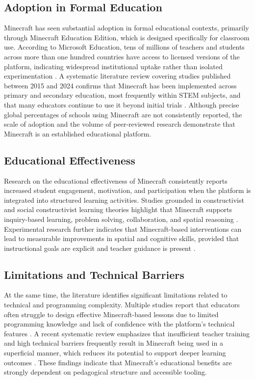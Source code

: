 \subsection{Adoption in Formal Education}

Minecraft has seen substantial adoption in formal educational contexts, primarily through Minecraft Education Edition, which is designed specifically for classroom use. 
According to Microsoft Education, tens of millions of teachers and students across more than one hundred countries have access to licensed versions of the platform, indicating widespread institutional uptake rather than isolated experimentation \cite{noauthor_licensing_nodate}. 
A systematic literature review covering studies published between 2015 and 2024 confirms that Minecraft has been implemented across primary and secondary education, most frequently within STEM subjects, and that many educators continue to use it beyond initial trials \cite{md_shamsudin_crafting_2024}. 
Although precise global percentages of schools using Minecraft are not consistently reported, the scale of adoption and the volume of peer-reviewed research demonstrate that Minecraft is an established educational platform.

\subsection{Educational Effectiveness}

Research on the educational effectiveness of Minecraft consistently reports increased student engagement, motivation, and participation when the platform is integrated into structured learning activities. 
Studies grounded in constructivist and social constructivist learning theories highlight that Minecraft supports inquiry-based learning, problem solving, collaboration, and spatial reasoning \cite{short_teaching_2012, kotsopoulos_pedagogical_2017}. 
Experimental research further indicates that Minecraft-based interventions can lead to measurable improvements in spatial and cognitive skills, provided that instructional goals are explicit and teacher guidance is present \cite{ming_exploring_2025}.

\subsection{Limitations and Technical Barriers}

At the same time, the literature identifies significant limitations related to technical and programming complexity. 
Multiple studies report that educators often struggle to design effective Minecraft-based lessons due to limited programming knowledge and lack of confidence with the platform's technical features \cite{bower_improving_2017, nebel_mining_2016}. 
A recent systematic review emphasizes that insufficient teacher training and high technical barriers frequently result in Minecraft being used in a superficial manner, which reduces its potential to support deeper learning outcomes \cite{md_shamsudin_crafting_2024}. 
These findings indicate that Minecraft's educational benefits are strongly dependent on pedagogical structure and accessible tooling.

